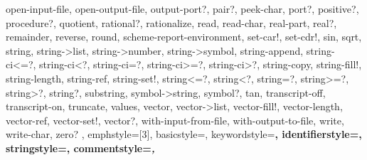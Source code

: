 {{    open-input-file, open-output-file, output-port?, pair?,
    peek-char, port?, positive?, procedure?, quotient,
    rational?, rationalize, read, read-char, real-part, real?,
    remainder, reverse, round, scheme-report-environment,
    set-car!, set-cdr!, sin, sqrt, string, string->list,
    string->number, string->symbol, string-append, string-ci<=?,
    string-ci<?, string-ci=?, string-ci>=?, string-ci>?,
    string-copy, string-fill!, string-length, string-ref,
    string-set!, string<=?, string<?, string=?, string>=?,
    string>?, string?, substring, symbol->string, symbol?,
    tan, transcript-off, transcript-on, truncate, values,
    vector, vector->list, vector-fill!, vector-length,
    vector-ref, vector-set!, vector?, with-input-from-file,
    with-output-to-file, write, write-char, zero?%
  },
  emphstyle=[3]\color{SchemeViolet},
  basicstyle=\color{SchemeLight}\ttfamily,
  keywordstyle=\color{SchemeBlue}\bfseries,
  identifierstyle=\color{SchemeDark},
  stringstyle=\color{SchemeGreen},
  commentstyle=\color{SchemeLight}\itshape,
}
